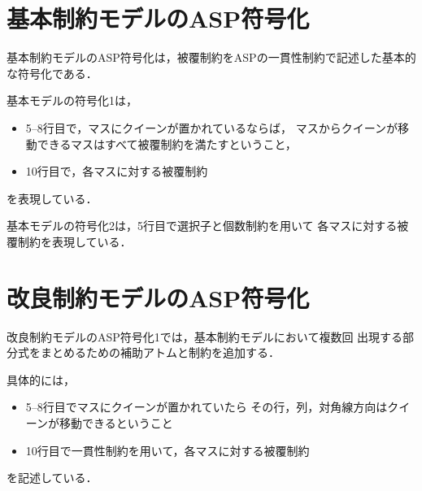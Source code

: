 \newpage

\section{基本制約モデルのASP符号化}
基本制約モデルのASP符号化は，被覆制約をASPの一貫性制約で記述した基本的な符号化である．



基本モデルの符号化1は，
\begin{itemize}
 \item 5--8行目で，マスにクイーンが置かれているならば，
  マスからクイーンが移動できるマスはすべて被覆制約を満たすということ，
 \item 10行目で，各マスに対する被覆制約
\end{itemize}
を表現している．




基本モデルの符号化2は，5行目で選択子と個数制約を用いて
各マスに対する被覆制約を表現している．
\newpage
\section{改良制約モデルのASP符号化}


改良制約モデルのASP符号化1では，基本制約モデルにおいて複数回
出現する部分式をまとめるための補助アトムと制約を追加する．

具体的には，
\begin{itemize}
  \item 5--8行目でマスにクイーンが置かれていたら
    その行，列，対角線方向はクイーンが移動できるということ
  \item 10行目で一貫性制約を用いて，各マスに対する被覆制約
\end{itemize}
を記述している．



